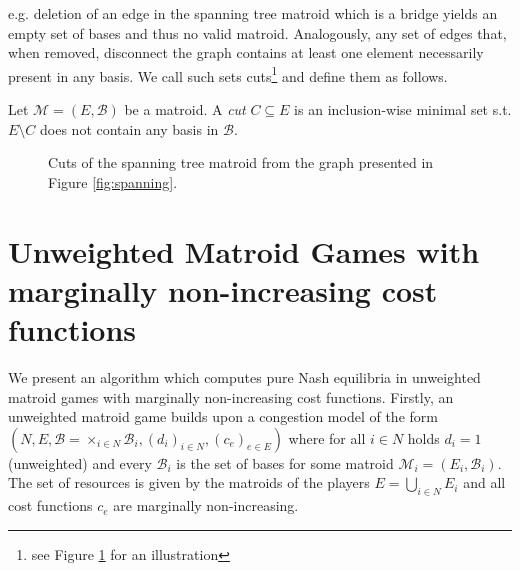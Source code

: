 \documentclass{scrartcl}
\theoremstyle{nonumberplain}
\newcommand{\tupel}[1]{\left(#1\right)}
\begin{document}
e.g. deletion of an edge in the spanning tree matroid which is a bridge yields
an empty set of bases and thus no valid matroid. Analogously, any set of edges
that, when removed, disconnect the graph contains at least one element
necessarily present in any basis. We call such sets cuts\footnote{see Figure
\ref{fig:cuts} for an illustration} and define them as follows.
\begin{defi}
  Let $\mathcal{M} = \tupel{E, \mathcal{B}}$ be a matroid. A \emph{cut}
  $C\subseteq E$ is an inclusion-wise minimal set s.t. $E\setminus C$ does not
  contain any basis in $\mathcal{B}$.
\end{defi}
\begin{figure}
  \begin{center}
  \end{center}
  \caption{Cuts of the spanning tree matroid from the graph presented in Figure
    \ref{fig:spanning}.}
  \label{fig:cuts}
\end{figure}

\section{Unweighted Matroid Games with marginally non-increasing cost
functions}
We present an algorithm which computes pure Nash equilibria in unweighted
matroid games with marginally non-increasing cost functions. Firstly, an
unweighted matroid game builds upon a congestion model of the form
$\tupel{N, E, \mathcal{B} = \times_{i\in N}\mathcal{B}_{i},
(d_{i})_{i\in N}, (c_{e})_{e\in E}}$ where for all $i\in N$ holds $d_{i} = 1$
(unweighted) and every $\mathcal{B}_{i}$ is the set of bases for some matroid
$\mathcal{M}_{i} = \tupel{E_{i}, \mathcal{B}_{i}}$. The set of resources is
given by the matroids of the players $E = \bigcup_{i\in N}E_{i}$ and all cost
functions $c_{e}$ are marginally non-increasing.
\end{document}
